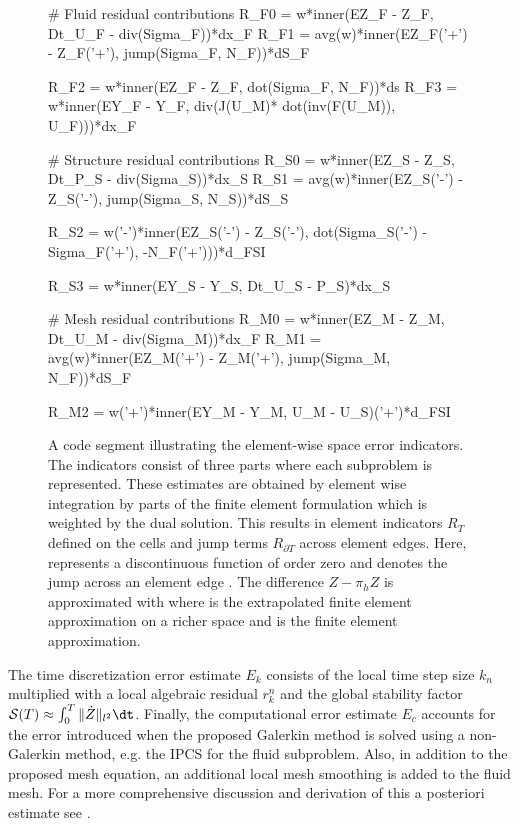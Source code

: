 \begin{figure}[tbp!]
\begin{python}
# Fluid residual contributions
R_F0 = w*inner(EZ_F - Z_F, Dt_U_F - div(Sigma_F))*dx_F
R_F1 = avg(w)*inner(EZ_F('+') - Z_F('+'),
              jump(Sigma_F, N_F))*dS_F

R_F2 = w*inner(EZ_F - Z_F, dot(Sigma_F, N_F))*ds
R_F3 = w*inner(EY_F - Y_F, div(J(U_M)*
         dot(inv(F(U_M)), U_F)))*dx_F

# Structure residual contributions
R_S0 = w*inner(EZ_S - Z_S, Dt_P_S - div(Sigma_S))*dx_S
R_S1 = avg(w)*inner(EZ_S('-') - Z_S('-'),
             jump(Sigma_S, N_S))*dS_S

R_S2 = w('-')*inner(EZ_S('-') - Z_S('-'),
             dot(Sigma_S('-') - Sigma_F('+'),
             -N_F('+')))*d_FSI

R_S3 = w*inner(EY_S - Y_S, Dt_U_S - P_S)*dx_S

# Mesh residual contributions
R_M0 = w*inner(EZ_M - Z_M, Dt_U_M - div(Sigma_M))*dx_F
R_M1 = avg(w)*inner(EZ_M('+') - Z_M('+'),
              jump(Sigma_M, N_F))*dS_F

R_M2 = w('+')*inner(EY_M - Y_M, U_M - U_S)('+')*d_FSI
\end{python}
\caption{A code segment illustrating the element-wise space error
  indicators. The indicators consist of three parts where each
  subproblem is represented. These estimates are obtained by element
  wise integration by parts of the finite element formulation which is
  weighted by the dual solution. This results in element indicators
  $R_T$ defined on the cells and jump terms $R_{\partial T}$ across
  element edges. Here,  represents a discontinuous function of
  order zero and  denotes the jump across an element edge
  . The difference $Z -\pi_h Z$ is approximated with  where  is the extrapolated finite element approximation
  on a richer space and  is the finite element approximation.}
\label{selim:fig:strong_residuals}
\end{figure}
The time discretization error estimate $E_k$ consists of the local time
step size $k_n$ multiplied with a local algebraic residual
$r_k^n$ and the global stability factor $\mathcal{S}(T) \approx
\int_0^T \| \dot{Z} \|_{l^2}\dt$. Finally, the computational error
estimate $E_c$ accounts for the error introduced when the proposed
Galerkin method is solved using a non-Galerkin method, e.g. the IPCS
for the fluid subproblem. Also, in addition to the proposed mesh
equation, an additional local mesh smoothing is added to the fluid
mesh.  For a more comprehensive discussion and derivation of this a
posteriori estimate see \citet{SelimLogg2011a}.

